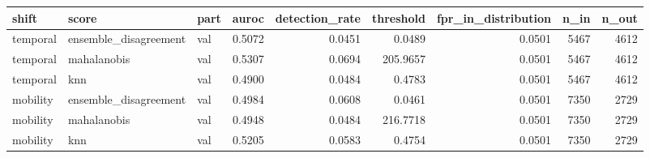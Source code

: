 \begin{tabular}{lllrrrrrr}
\toprule
shift & score & part & auroc & detection\_rate & threshold & fpr\_in\_distribution & n\_in & n\_out \\
\midrule
temporal & ensemble\_disagreement & val & 0.5072 & 0.0451 & 0.0489 & 0.0501 & 5467 & 4612 \\
temporal & mahalanobis & val & 0.5307 & 0.0694 & 205.9657 & 0.0501 & 5467 & 4612 \\
temporal & knn & val & 0.4900 & 0.0484 & 0.4783 & 0.0501 & 5467 & 4612 \\
mobility & ensemble\_disagreement & val & 0.4984 & 0.0608 & 0.0461 & 0.0501 & 7350 & 2729 \\
mobility & mahalanobis & val & 0.4948 & 0.0484 & 216.7718 & 0.0501 & 7350 & 2729 \\
mobility & knn & val & 0.5205 & 0.0583 & 0.4754 & 0.0501 & 7350 & 2729 \\
\bottomrule
\end{tabular}
